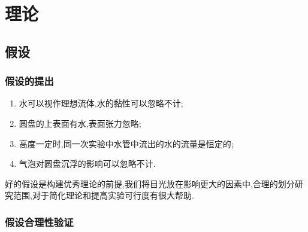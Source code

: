 \documentclass[UTF8]{gapd}
\begin{document}

\section{理论}
\label{sec:unsinkable_disc_theory}
\subsection{假设}
\subsubsection{假设的提出}
\begin{enumerate}
    \item 水可以视作理想流体,水的黏性可以忽略不计;
    \item 圆盘的上表面有水,表面张力忽略;
    \item 高度一定时,同一次实验中水管中流出的水的流量是恒定的;
    \item 气泡对圆盘沉浮的影响可以忽略不计.
\end{enumerate}

好的假设是构建优秀理论的前提,我们将目光放在影响更大的因素中,合理的划分研究范围,对于简化理论和提高实验可行度有很大帮助.
\subsubsection{假设合理性验证}
\end{document}
